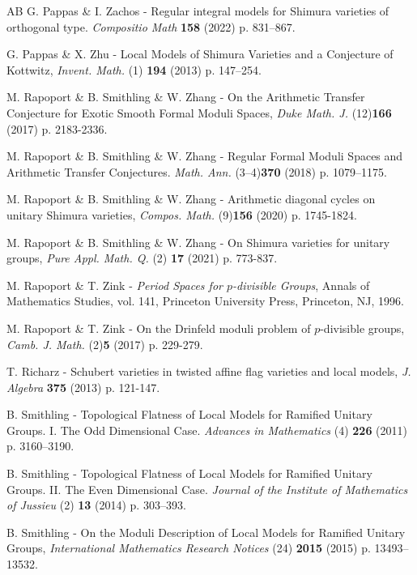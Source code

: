 \documentclass[pdflatex,sn-mathphys-num]{sn-jnl}%
\theoremstyle{thmstyleone}%
\theoremstyle{thmstyletwo}%
\numberwithin{equation}{subsection}
\theoremstyle{thmstylethree}%
\begin{document}
\begin{thebibliography}{AB}
G. Pappas \& I. Zachos - Regular integral models for Shimura varieties of orthogonal type. \emph{Compositio Math} \textbf{158} (2022) p. 831–867.

   
G. Pappas \& X. Zhu - Local Models of Shimura Varieties and a Conjecture of Kottwitz, 
\emph{Invent. Math.} (1) \textbf{194} (2013) p. 147–254. 

M. Rapoport \& B. Smithling \& W. Zhang - On the Arithmetic Transfer Conjecture for Exotic Smooth Formal Moduli Spaces,
\emph{Duke Math. J.} (12)\textbf{166} (2017) p. 2183-2336. 
			
M. Rapoport \& B. Smithling \& W. Zhang - Regular Formal Moduli Spaces and Arithmetic Transfer Conjectures. \emph{Math. Ann.} (3–4)\textbf{370} (2018) p. 1079–1175.

M. Rapoport \& B. Smithling \& W. Zhang - Arithmetic diagonal cycles on unitary {S}himura varieties,
\emph{Compos. Math.} (9)\textbf{156} (2020) p. 1745-1824.

M. Rapoport \& B. Smithling \& W. Zhang - On {S}himura varieties for unitary groups, 
\emph{Pure Appl. Math. Q.} (2) \textbf{17} (2021) p. 773-837. 



M. Rapoport \& T. Zink - \emph{Period Spaces for $p$-divisible Groups},
Annals of Mathematics Studies, vol. 141, 
Princeton University Press, Princeton, NJ, 1996. 

M. Rapoport \& T. Zink - On the {D}rinfeld moduli problem of {$p$}-divisible groups,
\emph{Camb. J. Math.} (2)\textbf{5} (2017) p. 229-279.

T. Richarz - Schubert varieties in twisted affine flag varieties and local models, 
\emph{J. Algebra} \textbf{375} (2013) p. 121-147. 
			
B. Smithling - Topological Flatness of Local Models for Ramified Unitary Groups. I. The Odd Dimensional Case. 
\emph{Advances in Mathematics} (4) \textbf{226} (2011) p. 3160–3190. 			
			
B. Smithling - Topological Flatness of Local Models for Ramified Unitary Groups. II. The Even Dimensional Case. 
\emph{Journal of the Institute of Mathematics of Jussieu} (2) \textbf{13} (2014) p. 303–393. 
			
B. Smithling - On the Moduli Description of Local Models for Ramified Unitary Groups, 
\emph{International Mathematics Research Notices} (24) \textbf{2015} (2015) p. 13493–13532. 
			

\end{thebibliography}
\end{document}
